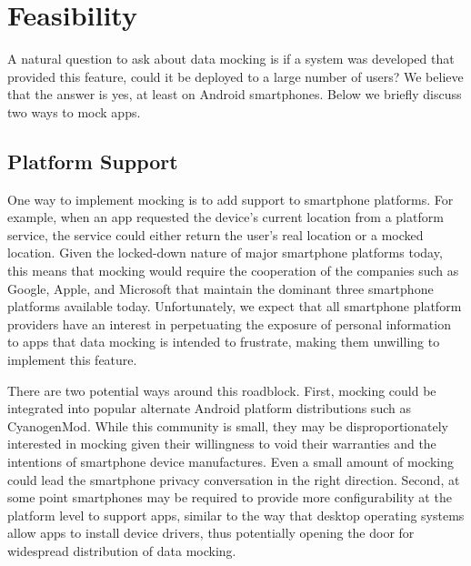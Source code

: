 \section{Feasibility}
\label{sec-feasibility}

A natural question to ask about data mocking is if a system was developed
that provided this feature, could it be deployed to a large number of users?
We believe that the answer is yes, at least on Android smartphones. Below we
briefly discuss two ways to mock apps.

\subsection{Platform Support}

One way to implement mocking is to add support to smartphone platforms. For
example, when an app requested the device's current location from a platform
service, the service could either return the user's real location or a mocked
location. Given the locked-down nature of major smartphone platforms today,
this means that mocking would require the cooperation of the companies such
as Google, Apple, and Microsoft that maintain the dominant three smartphone
platforms available today. Unfortunately, we expect that all smartphone
platform providers have an interest in perpetuating the exposure of personal
information to apps that data mocking is intended to frustrate, making them
unwilling to implement this feature.


There are two potential ways around this roadblock. First, mocking could be
integrated into popular alternate Android platform distributions such as
CyanogenMod. While this community is small, they may be disproportionately
interested in mocking given their willingness to void their warranties and
the intentions of smartphone device manufactures. Even a small amount of
mocking could lead the smartphone privacy conversation in the right
direction. Second, at some point smartphones may be required to provide more
configurability at the platform level to support apps, similar to the way
that desktop operating systems allow apps to install device drivers, thus
potentially opening the door for widespread distribution of data mocking.

